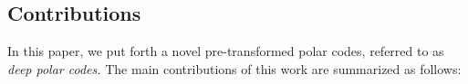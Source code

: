\documentclass[conference]{IEEEtran}
\begin{document}
    
         
         
    \subsection{Contributions}

     
     In this paper, we put forth a novel pre-transformed polar codes, referred to as \textit{deep polar codes.}  The main contributions of this work are summarized as follows:
     
\end{document}
